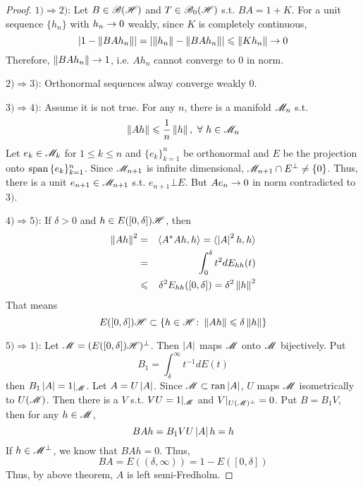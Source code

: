 \begin{proof}
	$1) \Rightarrow 2)$: Let $B \in \mathscr{B(H)}$ and $T \in \mathscr{B}_{0}\mathscr{(H)}$ s.t. $BA = 1+K$. For a unit sequence $\{h_n\}$ with $h_n \rightarrow 0$ weakly, since $K$ is completely continuous,
	\begin{equation*}
		\left\lvert1 - \left\lVert BAh_n\right\lVert\right\lvert = \left\lvert\left\lVert h_n\right\lVert - \left\lVert BAh_n\right\lVert\right\lvert \leqslant \left\lVert Kh_n\right\lVert \rightarrow 0
	\end{equation*}
	Therefore, $\left\lVert BAh_n\right\lVert \rightarrow 1$, i.e. $Ah_n$ cannot converge to $0$ in norm.
	\item $2) \Rightarrow 3)$: Orthonormal sequences alway converge weakly $0$.
	\item $3) \Rightarrow 4)$: Assume it is not true. For any $n$, there is a manifold $\mathscr{M}_n$ s.t. 
	\begin{equation*}
		\left\lVert Ah\right\lVert \leqslant \frac{1}{n} \left\lVert h\right\lVert,~\forall~ h \in \mathscr{M}_n
	\end{equation*}
	Let $e_k \in \mathscr{M}_k$ for $1 \leqslant k \leqslant n$ and $\{e_k\}_{k=1}^n$ be orthonormal and $E$ be the projection onto $\operatorname{span}{\{e_k\}_{k=1}^n}$. Since $\mathscr{M}_{n+1}$ is infinite dimensional,  $\mathscr{M}_{n+1} \cap E^{\bot} \neq \{0\}$. Thus, there is a unit $e_{n+1} \in \mathscr{M}_{n+1}$ s.t. $e_{n+1} \bot E$. But $Ae_n \rightarrow 0$ in norm contradicted to $3)$.
	\item $4) \Rightarrow 5)$: If $\delta > 0$ and $h \in E([0,\delta])\mathscr{H}$, then
	\begin{eqnarray*}
		\left\lVert Ah\right\lVert^2 &=& \langle A^{*}A h,h \rangle = \langle \left\lvert A\right\lvert^2 h,h \rangle \\
		&=& \int_0^{\delta} t^2 dE_{hh}(t) \\
		&\leqslant& \delta^2 E_{hh}([0,\delta]) = \delta^2 \left\lVert h\right\lVert^2
	\end{eqnarray*}
	That means
	\begin{equation*}
		E([0,\delta])\mathscr{H} \subset \{h \in \mathscr{H} \colon \left\lVert Ah\right\lVert \leqslant \delta \left\lVert h\right\lVert\}
	\end{equation*}
	\item $5) \Rightarrow 1)$: Let $\mathscr{M} = (E([0,\delta])\mathscr{H})^{\bot}$. Then $\left\lvert A\right\lvert$ maps $\mathscr{M}$ onto $\mathscr{M}$ bijectively. Put
	\begin{equation*}
		B_1 = \int_{\delta}^{\infty} t^{-1} dE(t)
	\end{equation*}
	then $B_1 \left\lvert A\right\lvert = 1|_{\mathscr{M}}$. Let $A = U \left\lvert A\right\lvert$. Since $\mathscr{M} \subset \operatorname{ran}{\left\lvert A\right\lvert}$, $U$ maps $\mathscr{M}$ isometrically to $U(\mathscr{M})$. Then there is a $V$ s.t. $VU = 1|_{\mathscr{M}}$ and $V|_{U(\mathscr{M})^{\bot}} = 0$. Put $B = B_1V$, then for any $h \in \mathscr{M}$,
	\begin{equation*}
		BAh = B_1 V U \left\lvert A\right\lvert h = h
	\end{equation*}
	If $h \in \mathscr{M}^{\bot}$, we know that $BAh = 0$. Thus,
	\begin{equation*}
		BA = E((\delta,\infty)) = 1 - E([0,\delta])
	\end{equation*}
	Thus, by above theorem, $A$ is left semi-Fredholm.
\end{proof}

